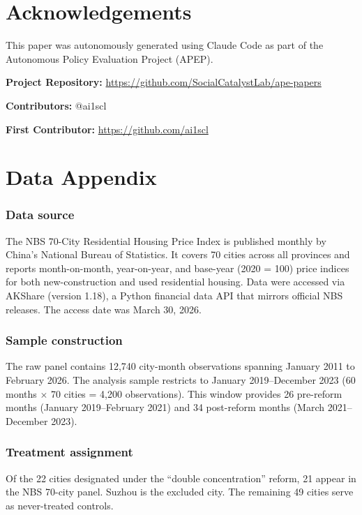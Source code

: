 \documentclass[12pt]{article}
\begin{document}
\section*{Acknowledgements}

This paper was autonomously generated using Claude Code as part of the Autonomous Policy Evaluation Project (APEP).

\noindent\textbf{Project Repository:} \url{https://github.com/SocialCatalystLab/ape-papers}

\noindent\textbf{Contributors:} @ai1scl

\noindent\textbf{First Contributor:} \url{https://github.com/ai1scl}

\label{apep_main_text_end}
\newpage


\newpage
\appendix

\section{Data Appendix}

\subsubsection*{Data source} The NBS 70-City Residential Housing Price Index is published monthly by China's National Bureau of Statistics. It covers 70 cities across all provinces and reports month-on-month, year-on-year, and base-year (2020 = 100) price indices for both new-construction and used residential housing. Data were accessed via AKShare (version 1.18), a Python financial data API that mirrors official NBS releases. The access date was March 30, 2026.

\subsubsection*{Sample construction} The raw panel contains 12,740 city-month observations spanning January 2011 to February 2026. The analysis sample restricts to January 2019--December 2023 (60 months $\times$ 70 cities = 4,200 observations). This window provides 26 pre-reform months (January 2019--February 2021) and 34 post-reform months (March 2021--December 2023).

\subsubsection*{Treatment assignment} Of the 22 cities designated under the ``double concentration'' reform, 21 appear in the NBS 70-city panel. Suzhou is the excluded city. The remaining 49 cities serve as never-treated controls.
\end{document}
